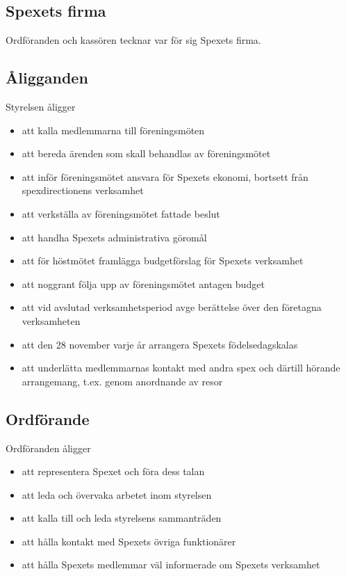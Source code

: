 \documentclass[a4paper]{article}
\begin{document}
\subsection{Spexets firma}
Ordföranden och kassören tecknar var för sig Spexets firma.

\subsection{Åligganden}
Styrelsen åligger

\begin{itemize}
  \item att kalla medlemmarna till föreningsmöten
  \item att bereda ärenden som skall behandlas av föreningsmötet
  \item att inför föreningsmötet ansvara för Spexets ekonomi, bortsett från spexdirectionens verksamhet
  \item att verkställa av föreningsmötet fattade beslut
  \item att handha Spexets administrativa göromål
  \item att för höstmötet framlägga budgetförslag för Spexets verksamhet
  \item att noggrant följa upp av föreningsmötet antagen budget
  \item att vid avslutad verksamhetsperiod avge berättelse över den företagna verksamheten
  \item att den 28 november varje år arrangera Spexets födelsedagskalas
  \item att underlätta medlemmarnas kontakt med andra spex och därtill hörande arrangemang, t.ex. genom anordnande av resor
\end{itemize}

\subsection{Ordförande}
Ordföranden åligger

\begin{itemize}
  \item att representera Spexet och föra dess talan
  \item att leda och övervaka arbetet inom styrelsen
  \item att kalla till och leda styrelsens sammanträden
  \item att hålla kontakt med Spexets övriga funktionärer
  \item att hålla Spexets medlemmar väl informerade om Spexets verksamhet
\end{itemize}
\end{document}
